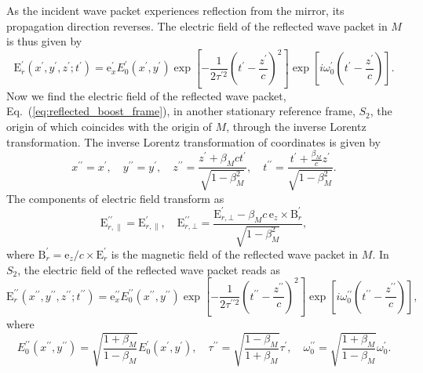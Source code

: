 \documentclass[10pt, a4paper, twoside, openright]{report}
\renewcommand{\vec}[1]{\boldsymbol{\mathrm{#1}}}
\begin{document}
As the incident wave packet experiences reflection from the mirror, its propagation direction reverses. The electric field of the reflected wave packet in $ M $ is thus given by
\begin{equation}\label{eq:reflected_boost_frame}
\vec{E}^{\prime}_r \left(x^{\prime}, y^{\prime}, z^{\prime}; t^{\prime} \right) = \vec{e}_x^{\prime} E^{\prime}_0 \left(x^{\prime}, y^{\prime} \right) \exp \left[ - \frac{1}{2\tau^{\prime 2}} \left(t^{\prime} - \frac{z^{\prime}}{c}\right)^2 \right] \exp \left[ i \omega_0^{\prime} \left(t^{\prime} - \frac{z^{\prime}}{c}\right) \right].
\end{equation}
Now we find the electric field of the reflected wave packet, Eq.~(\ref{eq:reflected_boost_frame}), in another stationary reference frame, $ S_2 $, the origin of which coincides with the origin of $ M $, through the inverse Lorentz transformation. The inverse Lorentz transformation of coordinates is given by
\begin{equation}\label{eq:inverse_lorentz_transform_coords}
x^{\prime \prime} = x^{\prime}, \quad y^{\prime \prime} = y^{\prime}, \quad z^{\prime \prime} = \frac{z^{\prime} + \beta_M c t^{\prime}}{\sqrt{1 - \beta_M^2}}, \quad t^{\prime \prime} = \frac{t^{\prime} + \frac{\beta_M}{c} z^{\prime}}{\sqrt{1 - \beta_M^2}}.
\end{equation}
The components of electric field transform as
\begin{equation}\label{eq:inverse_lorentz_transform_fields}
\vec{E}^{\prime \prime}_{r, \parallel} = \vec{E}^{\prime}_{r, \parallel}, \quad \vec{E}^{\prime \prime}_{r, \bot} = \frac{\vec{E}^{\prime}_{r, \bot} - \beta_M c \, \vec{e}_z \times \vec{B}^{\prime}_{r}}{\sqrt{1 - \beta_M^2}},
\end{equation}
where $ \vec{B}^{\prime}_{r} = \vec{e}_z / c \times \vec{E}^{\prime}_r $ is the magnetic field of the reflected wave packet in $ M $. In $ S_2 $, the electric field of the reflected wave packet reads as
\begin{equation}\label{eq:reflected_lab_frame_1}
\vec{E}^{\prime \prime}_r \left(x^{\prime \prime}, y^{\prime \prime}, z^{\prime \prime}; t^{\prime \prime} \right) = \vec{e}_x^{\prime \prime} E^{\prime \prime}_0 \left(x^{\prime \prime}, y^{\prime \prime} \right) \exp \left[ - \frac{1}{2 \tau^{\prime \prime 2}} \left(t^{\prime \prime} - \frac{z^{\prime \prime}}{c}\right)^2 \right] \exp \left[ i \omega_0^{\prime \prime} \left(t^{\prime \prime} - \frac{z^{\prime \prime}}{c}\right) \right],
\end{equation}
where
\begin{equation}\label{eq:coeff_lab}
E^{\prime \prime}_0 \left(x^{\prime \prime}, y^{\prime \prime} \right) = \sqrt{\frac{1 + \beta_M}{1 - \beta_M}} E^{\prime}_0 \left(x^{\prime}, y^{\prime} \right), \quad \tau^{\prime \prime} = \sqrt{\frac{1 - \beta_M}{1 + \beta_M}} \tau^{\prime}, \quad \omega_0^{\prime \prime} = \sqrt{\frac{1 + \beta_M}{1 - \beta_M}} \omega_0^{\prime}.
\end{equation}
\end{document}
